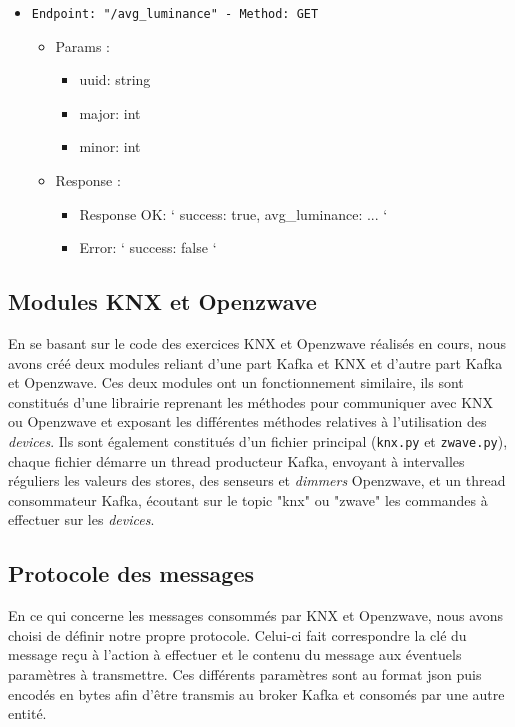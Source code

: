 \begin{itemize}
  \item \texttt{Endpoint: "/avg_luminance" -  Method: GET}
  \begin{itemize} 
    \item Params :
    \begin{itemize}
      \item uuid: string
      \item major: int
      \item minor: int
    \end{itemize}

    \item Response : 
    \begin{itemize}
      \item Response OK: `{ success: true, avg_luminance: ... }`
      \item Error: `{ success: false }`
    \end{itemize}
  \end{itemize}
\end{itemize}




\subsection{Modules KNX et Openzwave}
En se basant sur le code des exercices KNX et Openzwave réalisés en cours, nous avons créé deux modules reliant d'une part Kafka et KNX et d'autre part Kafka et Openzwave. Ces deux modules ont un fonctionnement similaire, ils sont constitués d'une librairie reprenant les méthodes pour communiquer avec KNX ou Openzwave et exposant les différentes méthodes relatives à l'utilisation des \textit{devices}. Ils sont également constitués d'un fichier principal (\texttt{knx.py} et \texttt{zwave.py}), chaque fichier démarre un thread producteur Kafka, envoyant à intervalles réguliers les valeurs des stores, des senseurs et \textit{dimmers} Openzwave, et un thread consommateur Kafka, écoutant sur le topic "knx" ou "zwave" les commandes à effectuer sur les \textit{devices}.

\subsection{Protocole des messages}
En ce qui concerne les messages consommés par KNX et Openzwave, nous avons choisi de définir notre propre protocole.
Celui-ci fait correspondre la clé du message reçu à l'action à effectuer et le contenu du message aux éventuels paramètres à transmettre. Ces différents paramètres sont au format \acrshort{json} puis encodés en bytes afin d'être transmis au broker Kafka et consomés par une autre entité.

